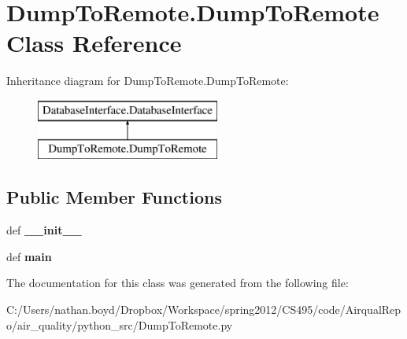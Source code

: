 \hypertarget{class_dump_to_remote_1_1_dump_to_remote}{\section{Dump\-To\-Remote.\-Dump\-To\-Remote Class Reference}
\label{class_dump_to_remote_1_1_dump_to_remote}
}
Inheritance diagram for Dump\-To\-Remote.\-Dump\-To\-Remote\-:\begin{figure}[H]
\begin{center}
\leavevmode
\includegraphics[height=2.000000cm]{class_dump_to_remote_1_1_dump_to_remote}
\end{center}
\end{figure}
\subsection*{Public Member Functions}
\begin{DoxyCompactItemize}
\item 
\hypertarget{class_dump_to_remote_1_1_dump_to_remote_ad564941589b93a68ff46498cc21da2f2}{def {\bfseries \-\_\-\-\_\-init\-\_\-\-\_\-}}\label{class_dump_to_remote_1_1_dump_to_remote_ad564941589b93a68ff46498cc21da2f2}

\item 
\hypertarget{class_dump_to_remote_1_1_dump_to_remote_adb91f51d25a482426704c6a0c0c1377f}{def {\bfseries main}}\label{class_dump_to_remote_1_1_dump_to_remote_adb91f51d25a482426704c6a0c0c1377f}

\end{DoxyCompactItemize}


The documentation for this class was generated from the following file\-:\begin{DoxyCompactItemize}
\item 
C\-:/\-Users/nathan.\-boyd/\-Dropbox/\-Workspace/spring2012/\-C\-S495/code/\-Airqual\-Repo/air\-\_\-quality/python\-\_\-src/Dump\-To\-Remote.\-py\end{DoxyCompactItemize}
